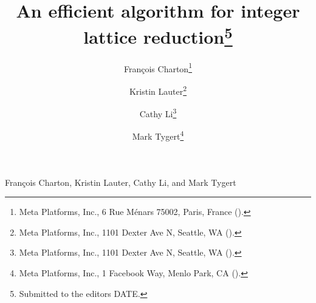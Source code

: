 %
%
%



\usepackage{lipsum}
\usepackage{amsfonts}
\usepackage{graphicx}
\usepackage{epstopdf}
\ifpdf
\else
\fi

\newcommand{\creflastconjunction}{, and~}


        {Fran\c{c}ois Charton, Kristin Lauter, Cathy Li, and Mark Tygert}

\title{An efficient algorithm for integer lattice reduction\thanks{Submitted
to the editors DATE.
}}

\author{Fran\c{c}ois Charton\thanks{Meta Platforms, Inc.,
  6 Rue M\'{e}nars 75002, Paris, France ().}
\and Kristin Lauter\thanks{Meta Platforms, Inc.,
  1101 Dexter Ave N, Seattle, WA ().}
\and Cathy Li\thanks{Meta Platforms, Inc.,
  1101 Dexter Ave N, Seattle, WA ().}
\and Mark Tygert\thanks{Meta Platforms, Inc.,
  1 Facebook Way, Menlo Park, CA ().}}

\usepackage{amsopn}
\DeclareMathOperator{\nint}{nint}
\DeclareMathOperator*{\argmin}{argmin}
\DeclareMathOperator{\bigoh}{\mathcal{O}}
\def\Id{\rm Id}

